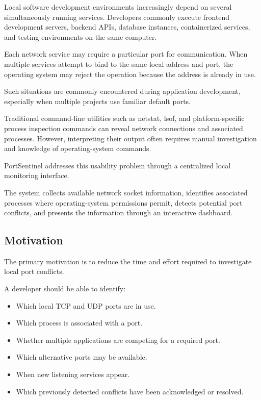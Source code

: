 \documentclass[conference]{IEEEtran}
\begin{document}
Local software development environments increasingly depend
on several simultaneously running services. Developers
commonly execute frontend development servers, backend APIs,
database instances, containerized services, and testing
environments on the same computer.

Each network service may require a particular port for
communication. When multiple services attempt to bind to
the same local address and port, the operating system may
reject the operation because the address is already in use.

Such situations are commonly encountered during application
development, especially when multiple projects use familiar
default ports.

Traditional command-line utilities such as netstat,
lsof, and platform-specific process inspection commands
can reveal network connections and associated processes.
However, interpreting their output often requires manual
investigation and knowledge of operating-system commands.

PortSentinel addresses this usability problem through a
centralized local monitoring interface.

The system collects available network socket information,
identifies associated processes where operating-system
permissions permit, detects potential port conflicts,
and presents the information through an interactive
dashboard.

\subsection{Motivation}

The primary motivation is to reduce the time and effort
required to investigate local port conflicts.

A developer should be able to identify:

\begin{itemize}
    \item Which local TCP and UDP ports are in use.
    \item Which process is associated with a port.
    \item Whether multiple applications are competing for
    a required port.
    \item Which alternative ports may be available.
    \item When new listening services appear.
    \item Which previously detected conflicts have been
    acknowledged or resolved.
\end{itemize}
\end{document}
